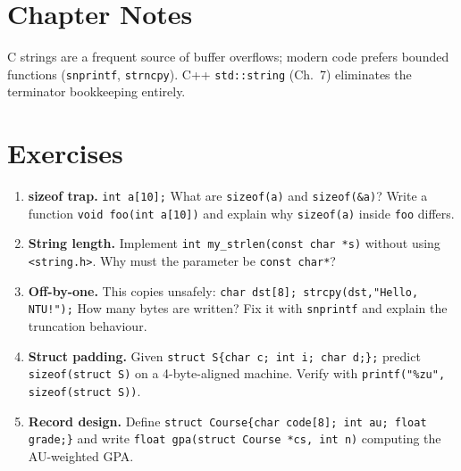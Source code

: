 \section{Chapter Notes}
C strings are a frequent source of buffer overflows; modern code prefers bounded functions (\texttt{snprintf}, \texttt{strncpy}). C++ \texttt{std::string} (Ch.~7) eliminates the terminator bookkeeping entirely.

\section{Exercises}
\begin{enumerate}[label=E3.\arabic*, leftmargin=*, itemsep=0.6em]
\item \textbf{sizeof trap.} \texttt{int a[10];} What are \texttt{sizeof(a)} and \texttt{sizeof(\&a)}? Write a function \texttt{void foo(int a[10])} and explain why \texttt{sizeof(a)} inside \texttt{foo} differs.
\item \textbf{String length.} Implement \texttt{int my\_strlen(const char *s)} without using \texttt{<string.h>}. Why must the parameter be \texttt{const char*}?
\item \textbf{Off-by-one.} This copies unsafely: \texttt{char dst[8]; strcpy(dst,"Hello, NTU!");} How many bytes are written? Fix it with \texttt{snprintf} and explain the truncation behaviour.
\item \textbf{Struct padding.} Given \texttt{struct S\{char c; int i; char d;\};} predict \texttt{sizeof(struct S)} on a 4-byte-aligned machine. Verify with \texttt{printf("\%zu", sizeof(struct S))}.
\item \textbf{Record design.} Define \texttt{struct Course\{char code[8]; int au; float grade;\}} and write \texttt{float gpa(struct Course *cs, int n)} computing the AU-weighted GPA.
\end{enumerate}
